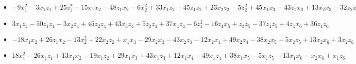 \documentclass[11pt, english]{article}
\begin{document}
\begin{itemize}
\item $-9 {x}_{1}^{2}-3 {x}_{1} {z}_{1}+25 {z}_{1}^{2}+15
       {x}_{1} {x}_{2}-48 {z}_{1} {x}_{2}-6 {x}_{2}^{2}+33 {x}_{1}
       {z}_{2}-45 {z}_{1} {z}_{2}+23 {x}_{2} {z}_{2}-5 {z}_{2}^{2}+45
       {x}_{1} {x}_{3}-43 {z}_{1} {x}_{3}+13 {x}_{2} {x}_{3}-32 {z}_{2}
       {x}_{3}-31 {x}_{3}^{2}-30 {x}_{1} {z}_{3}-5 {z}_{1} {z}_{3}+25
       {x}_{2} {z}_{3}-46 {z}_{2} {z}_{3}-26 {x}_{3} {z}_{3}-25
       {z}_{3}^{2}-20 {x}_{1} {x}_{4}-37 {z}_{1} {x}_{4}-17 {x}_{2}
       {x}_{4}+3 {z}_{2} {x}_{4}+50 {x}_{3} {x}_{4}+34 {z}_{3} {x}_{4}+45
       {x}_{4}^{2}+36 {x}_{1} {z}_{4}+6 {z}_{1} {z}_{4}-30 {x}_{2}
       {z}_{4}+35 {z}_{2} {z}_{4}+11 {x}_{3} {z}_{4}-41 {z}_{3}
       {z}_{4}+40 {x}_{4} {z}_{4}-36 {z}_{4}^{2}-5 {x}_{1} {x}_{5}+16
       {z}_{1} {x}_{5}+21 {x}_{2} {x}_{5}+26 {z}_{2} {x}_{5}-38 {x}_{3}
       {x}_{5}-42 {z}_{3} {x}_{5}-28 {x}_{4} {x}_{5}+10 {z}_{4}
       {x}_{5}+47 {x}_{5}^{2}+20 {x}_{1} {z}_{5}+37 {z}_{1} {z}_{5}+17
       {x}_{2} {z}_{5}-2 {z}_{2} {z}_{5}-50 {x}_{3} {z}_{5}-34 {z}_{3}
       {z}_{5}+11 {x}_{4} {z}_{5}-40 {z}_{4} {z}_{5}+28 {x}_{5}
       {z}_{5}+45 {z}_{5}^{2}-30 {x}_{1} {x}_{6}-5 {z}_{1} {x}_{6}+26
       {x}_{2} {x}_{6}-46 {z}_{2} {x}_{6}-26 {x}_{3} {x}_{6}-50 {z}_{3}
       {x}_{6}+34 {x}_{4} {x}_{6}-41 {z}_{4} {x}_{6}-42 {x}_{5}
       {x}_{6}-34 {z}_{5} {x}_{6}-24 {x}_{6}^{2}-14 {x}_{1} {z}_{6}-36
       {z}_{1} {z}_{6}-22 {x}_{2} {z}_{6}-8 {z}_{2} {z}_{6}+35 {x}_{3}
       {z}_{6}+44 {z}_{3} {z}_{6}-38 {x}_{4} {z}_{6}+28 {z}_{4}
       {z}_{6}+41 {x}_{5} {z}_{6}+38 {z}_{5} {z}_{6}+44 {x}_{6}
       {z}_{6}+17 {z}_{6}^{2}$

\item $3 {x}_{1} {z}_{4}-50 {z}_{1} {z}_{4}-3
       {x}_{2} {z}_{4}+45 {z}_{2} {z}_{4}+43 {x}_{3} {z}_{4}+5 {z}_{3}
       {z}_{4}+37 {x}_{4} {z}_{4}-6 {z}_{4}^{2}-16 {z}_{4}
       {x}_{5}+{z}_{3} {z}_{5}-37 {z}_{4} {z}_{5}+4 {z}_{4} {x}_{6}+36
       {z}_{4} {z}_{6}$

\item $-18 {x}_{1} {x}_{2}+26 {z}_{1} {x}_{2}-13
       {x}_{2}^{2}+22 {x}_{2} {z}_{2}+{x}_{1} {x}_{3}-29 {x}_{2}
       {x}_{3}-43 {x}_{2} {z}_{3}-12 {x}_{2} {x}_{4}+49 {x}_{2}
       {z}_{4}-38 {x}_{2} {x}_{5}+5 {x}_{2} {z}_{5}+13 {x}_{2} {x}_{6}+3
       {x}_{2} {z}_{6}$

\item $18 {x}_{1}^{2}-26 {x}_{1} {z}_{1}+13 {x}_{1}
       {x}_{2}-19 {x}_{1} {z}_{2}+29 {x}_{1} {x}_{3}+43 {x}_{1}
       {z}_{3}+12 {x}_{1} {x}_{4}-49 {x}_{1} {z}_{4}+38 {x}_{1} {x}_{5}-5
       {x}_{1} {z}_{5}-13 {x}_{1} {x}_{6}-{x}_{2} {x}_{6}+{x}_{1}
       {z}_{6}$


\end{itemize}
\end{document}
